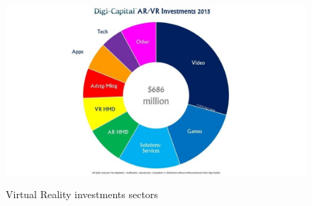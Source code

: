 \begin{figure}[H]
\centering
\includegraphics[width=15cm, height=7cm]{immagini/vrsectors.png}
\caption{Virtual Reality investments sectors}\label{fig:investments}
\end{figure}

